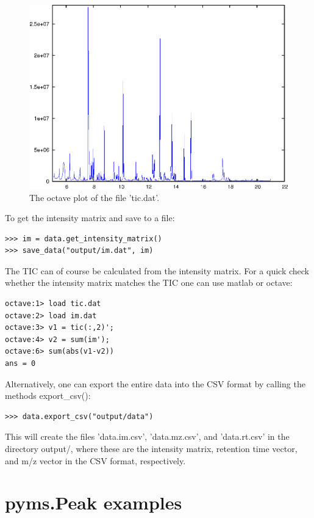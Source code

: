 \begin{figure}[htp]
\begin{center}
\includegraphics{graphics/tic.eps}
\caption{The octave plot of the file 'tic.dat'.}
\label{ticplot}
\end{center}
\end{figure}

To get the intensity matrix and save to a file:

\begin{verbatim}
>>> im = data.get_intensity_matrix()
>>> save_data("output/im.dat", im)
\end{verbatim}

\noindent
The TIC can of course be calculated from the intensity matrix. For a quick
check whether the intensity matrix matches the TIC one can use matlab or
octave:

\begin{verbatim}
octave:1> load tic.dat
octave:2> load im.dat
octave:3> v1 = tic(:,2)';
octave:4> v2 = sum(im');
octave:6> sum(abs(v1-v2))
ans = 0
\end{verbatim}

Alternatively, one can export the entire data into the CSV format by
calling the methods export\_csv():

\begin{verbatim}
>>> data.export_csv("output/data")
\end{verbatim}

\noindent
This will create the files 'data.im.csv', 'data.mz.csv', and 'data.rt.csv'
in the directory output/, where these are the intensity matrix, retention
time vector, and m/z vector in the CSV format, respectively.

\section{pyms.Peak examples}

